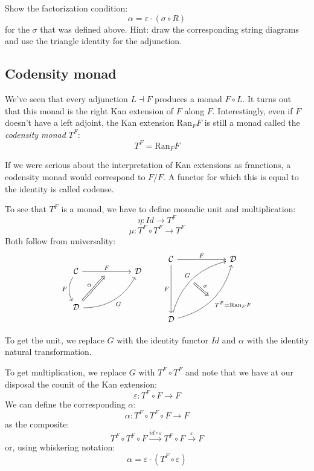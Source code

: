 \documentclass[DaoFP]{subfiles}
\begin{document}
\begin{exercise}
Show the factorization condition: 
\[ \alpha = \varepsilon \cdot (\sigma \circ R) \]
for the $\sigma$ that was defined above. Hint: draw the corresponding string diagrams and use the triangle identity for the adjunction.
\end{exercise}

 \subsection{Codensity monad}
 
 We've seen that every adjunction $L \dashv F$ produces a monad $F \circ L$. It turns out that this monad is the right Kan extension of $F$ along $F$. Interestingly, even if $F$ doesn't have a left adjoint, the Kan extension $\text{Ran}_F F$ is still a monad called the \emph{codensity monad} $T^F$:
 \[ T^F = \text{Ran}_F F \]
 
If we were serious about the interpretation of Kan extensions as franctions, a codensity monad would correspond to $F/F$. A functor for which this is equal to the identity is called codense.

To see that $T^F$ is a monad, we have to define monadic unit and multiplication:
\[ \eta \colon Id \to T^F \]
\[ \mu \colon T^F \circ T^F \to  T^F \]
 Both follow from universality:
\[
 \begin{tikzcd} [row sep=1cm, column sep=1cm]
 \cat C
 \arrow[rr, "F", "" {name=ID, below} ]
 \arrow[d, bend right, "F"']
 && \cat D
 \\
 \cat D
  \arrow[urr, bend right, "G"']
 \arrow[Rightarrow, "\alpha",  to=ID]
 \end{tikzcd}
 \qquad
\begin{tikzcd}[row sep=2cm, column sep=2cm]
\cat C  \ar[d, "F"', "" {name=P}]
            \ar[r, "F", ""  {name=F, below, near start, bend right}]
&
\cat D
\\
\cat D
    \ar[ur, bend left, "G", "" {name=G, below}]
    \ar[ur, bend right, "T^F = \text{Ran}_F F"', "" {name=Ran}]
\arrow[Rightarrow, "\sigma", from=G, to=Ran]
\end{tikzcd}
\]

To get the unit, we replace $G$ with the identity functor $Id$ and $\alpha$ with the identity natural transformation. 

To get multiplication, we replace $G$ with $T^F \circ T^F$ and note that we have at our disposal the counit of the Kan extension:
\[ \varepsilon \colon  T^F \circ F \to F \]
We can define the corresponding $\alpha$:
\[ \alpha \colon T^F \circ T^F \circ F \to F \]
as the composite:
\[ T^F \circ T^F \circ F \xrightarrow{id \circ \varepsilon} T^F \circ F \xrightarrow{\varepsilon} F\]
or, using whiskering notation:
\[ \alpha = \varepsilon \cdot (T^F \circ \varepsilon) \]
\end{document}
